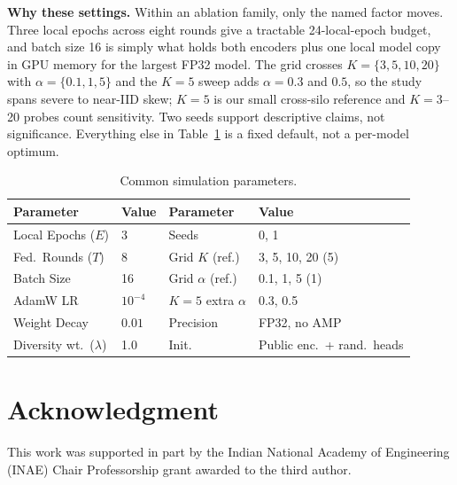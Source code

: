 \documentclass[letterpaper, conference]{IEEEtran}
\begin{document}
\textbf{Why these settings.}
Within an ablation family, only the named factor moves. Three local epochs across
eight rounds give a tractable 24-local-epoch budget, and batch size 16 is simply what
holds both encoders plus one local model copy in GPU memory for the largest FP32
model. The grid crosses $K{=}\{3,5,10,20\}$ with $\alpha{=}\{0.1,1,5\}$ and the
$K{=}5$ sweep adds $\alpha{=}0.3$ and $0.5$, so the study spans severe to near-IID
skew; $K{=}5$ is our small cross-silo reference and $K{=}3$--20 probes count
sensitivity. Two seeds support descriptive claims, not significance. Everything else
in Table~\ref{tab:hyper} is a fixed default, not a per-model optimum.

\begin{table}[t]
\caption{Common simulation parameters.}
\label{tab:hyper}
\centering\footnotesize
\setlength{\tabcolsep}{4pt}
\begin{tabular}{llll}
\toprule
\textbf{Parameter} & \textbf{Value} & \textbf{Parameter} & \textbf{Value} \\
\midrule
Local Epochs ($E$)   & 3      & Seeds                    & 0, 1 \\
Fed.\ Rounds ($T$)   & 8      & Grid $K$ (ref.)          & 3, 5, 10, 20 (5) \\
Batch Size           & 16     & Grid $\alpha$ (ref.)     & 0.1, 1, 5 (1) \\
AdamW LR             & $10^{-4}$ & $K{=}5$ extra $\alpha$ & 0.3, 0.5 \\
Weight Decay         & $0.01$ & Precision                & FP32, no AMP \\
Diversity wt.\ ($\lambda$) & 1.0 & Init.                & Public enc.\ + rand.\ heads \\
\bottomrule
\end{tabular}
\end{table}




\FloatBarrier

\let\oldbibliography\thebibliography
\renewcommand{\thebibliography}[1]{%
  \oldbibliography{#1}%
  \fontsize{6.3}{6.9}\selectfont
  \setlength{\itemsep}{0pt}%
  \setlength{\parskip}{0pt}%
  \setlength{\parsep}{0pt}%
  \setlength{\topsep}{0pt}%
  \setlength{\labelsep}{3pt}%
  \linespread{0.90}\selectfont
}

\section*{Acknowledgment}
This work was supported in part by the Indian National Academy of Engineering
(INAE) Chair Professorship grant awarded to the third author.
\end{document}
